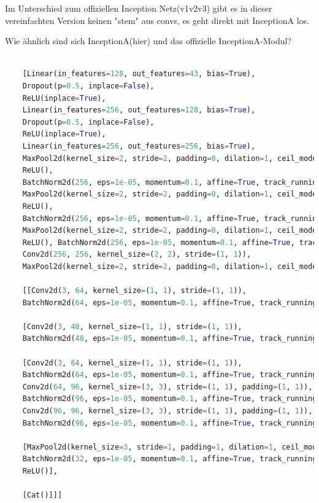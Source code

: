 \documentclass[twoside, 11pt,a4paper]{article}
\numberwithin{equation}{section}
\begin{document}
	Im Unterschied zum offiziellen Inception Netz(v1v2v3) gibt es in dieser 
	vereinfachten Version keinen "stem" aus convs, 
	es geht direkt mit InceptionA los.
	
	Wie ähnlich sind sich InceptionA(hier) und das offizielle InceptionA-Modul?
	\begin{lstlisting}[language=Python, caption=Reversed Model incv3]
	
	[Linear(in_features=128, out_features=43, bias=True), 
	Dropout(p=0.5, inplace=False), 
	ReLU(inplace=True), 
	Linear(in_features=256, out_features=128, bias=True), 
	Dropout(p=0.5, inplace=False), 
	ReLU(inplace=True), 
	Linear(in_features=256, out_features=256, bias=True), 
	MaxPool2d(kernel_size=2, stride=2, padding=0, dilation=1, ceil_mode=False), 
	ReLU(), 
	BatchNorm2d(256, eps=1e-05, momentum=0.1, affine=True, track_running_stats=True), Conv2d(256, 256, kernel_size=(2, 2), stride=(1, 1)), 
	MaxPool2d(kernel_size=2, stride=2, padding=0, dilation=1, ceil_mode=False), 
	ReLU(), 
	BatchNorm2d(256, eps=1e-05, momentum=0.1, affine=True, track_running_stats=True), Conv2d(256, 256, kernel_size=(2, 2), stride=(1, 1)), 
	MaxPool2d(kernel_size=2, stride=2, padding=0, dilation=1, ceil_mode=False), 
	ReLU(), BatchNorm2d(256, eps=1e-05, momentum=0.1, affine=True, track_running_stats=True), 
	Conv2d(256, 256, kernel_size=(2, 2), stride=(1, 1)), 
	MaxPool2d(kernel_size=2, stride=2, padding=0, dilation=1, ceil_mode=False),
	
	[[Conv2d(3, 64, kernel_size=(1, 1), stride=(1, 1)), 
	BatchNorm2d(64, eps=1e-05, momentum=0.1, affine=True, track_running_stats=True), ReLU()], 
	
	[Conv2d(3, 48, kernel_size=(1, 1), stride=(1, 1)), 
	BatchNorm2d(48, eps=1e-05, momentum=0.1, affine=True, track_running_stats=True), ReLU(), Conv2d(48, 64, kernel_size=(5, 5), stride=(1, 1), padding=(2, 2)), BatchNorm2d(64, eps=1e-05, momentum=0.1, affine=True, track_running_stats=True), ReLU()], 
	
	[Conv2d(3, 64, kernel_size=(1, 1), stride=(1, 1)), 
	BatchNorm2d(64, eps=1e-05, momentum=0.1, affine=True, track_running_stats=True), ReLU(), 
	Conv2d(64, 96, kernel_size=(3, 3), stride=(1, 1), padding=(1, 1)), 
	BatchNorm2d(96, eps=1e-05, momentum=0.1, affine=True, track_running_stats=True), ReLU(), 
	Conv2d(96, 96, kernel_size=(3, 3), stride=(1, 1), padding=(1, 1)), 
	BatchNorm2d(96, eps=1e-05, momentum=0.1, affine=True, track_running_stats=True), ReLU()], 
	
	[MaxPool2d(kernel_size=3, stride=1, padding=1, dilation=1, ceil_mode=False), Conv2d(3, 32, kernel_size=(1, 1), stride=(1, 1)), 
	BatchNorm2d(32, eps=1e-05, momentum=0.1, affine=True, track_running_stats=True), 
	ReLU()], 
	
	[Cat()]]]
	\end{lstlisting}
\end{document}
